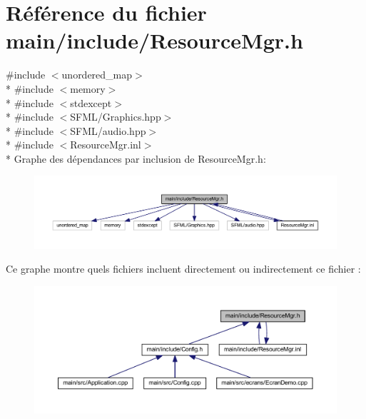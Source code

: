 \section{Référence du fichier main/include/\+Resource\+Mgr.h}
\label{_resource_mgr_8h}
{\ttfamily \#include $<$unordered\+\_\+map$>$}\\*
{\ttfamily \#include $<$memory$>$}\\*
{\ttfamily \#include $<$stdexcept$>$}\\*
{\ttfamily \#include $<$S\+F\+M\+L/\+Graphics.\+hpp$>$}\\*
{\ttfamily \#include $<$S\+F\+M\+L/audio.\+hpp$>$}\\*
{\ttfamily \#include $<$Resource\+Mgr.\+inl$>$}\\*
Graphe des dépendances par inclusion de Resource\+Mgr.\+h\+:\nopagebreak
\begin{figure}[H]
\begin{center}
\leavevmode
\includegraphics[width=350pt]{_resource_mgr_8h__incl}
\end{center}
\end{figure}
Ce graphe montre quels fichiers incluent directement ou indirectement ce fichier \+:\nopagebreak
\begin{figure}[H]
\begin{center}
\leavevmode
\includegraphics[width=350pt]{_resource_mgr_8h__dep__incl}
\end{center}
\end{figure}
